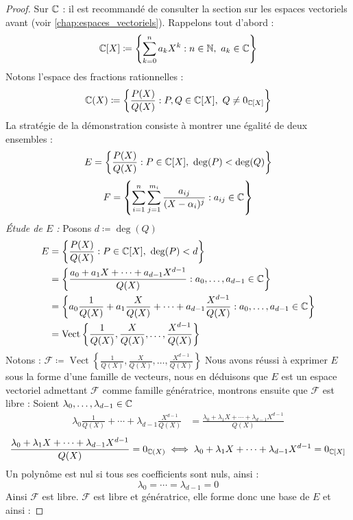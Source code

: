 \begin{proof}\cite{math-sup.fr_decomp}
    Sur $\mathbb{C}$ : il est recommandé de consulter la section sur les espaces vectoriels avant (voir \autoref{chap:espaces_vectoriels}).
    Rappelons tout d'abord :
    \[ \mathbb{C}[X] \coloneqq \left\{ \sum_{k = 0}^{n} a_k X^k : n \in \mathbb{N},\ a_k \in \mathbb{C} \right\} \]
    Notons l'espace des fractions rationnelles :
    \[ \mathbb{C}(X) \coloneqq \left\{ \frac{P(X)}{Q(X)} : P, Q \in \mathbb{C}[X],\ Q \neq 0_{\mathbb{C}[X]} \right\} \]
    La stratégie de la démonstration consiste à montrer une égalité de deux ensembles :
    \[ E = \left\{ \frac{P(X)}{Q(X)} : P \in \C[X],\ \deg(P) < \deg(Q) \right\} \]
    \[ F = \left\{ \sum_{i = 1}^{n} \sum_{j = 1}^{m_i} \frac{a_{ij}}{(X - \alpha_i)^{j}} : a_{ij} \in \mathbb{C} \right\} \]
    \emph{\'Etude de $E$ :} Posons $d \coloneqq \deg(Q)$
    \begin{align*}
        E &= \left\{ \frac{P(X)}{Q(X)} : P \in \mathbb{C}[X],\ \deg(P) < d \right\} \\
          &= \left\{ \frac{a_0 + a_1X + \cdots + a_{d - 1} X^{d - 1}}{Q(X)} : a_0, \ldots, a_{d - 1} \in \mathbb{C} \right\} \\
          &= \left\{ a_0 \frac{1}{Q(X)} + a_1 \frac{X}{Q(X)} + \cdots + a_{d - 1} \frac{X^{d-1}}{Q(X)} : a_0, \ldots, a_{d - 1} \in \mathbb{C} \right\} \\
          &= \operatorname{Vect}\left\{ \frac{1}{Q(X)}, \frac{X}{Q(X)}, \ldots, \frac{X^{d-1}}{Q(X)} \right\}
    \end{align*}
    Notons : $\mathcal{F} \coloneqq \operatorname{Vect}\left\{ \frac{1}{Q(X)}, \frac{X}{Q(X)}, \ldots, \frac{X^{d-1}}{Q(X)} \right\}$
    Nous avons réussi à exprimer $E$ sous la forme d'une famille de vecteurs, nous en déduisons que $E$ est un espace vectoriel admettant $\mathcal{F}$ comme famille génératrice, montrons ensuite que $\mathcal{F}$ est libre :
    Soient $ \lambda_0,\ldots,\lambda_{d-1} \in \mathbb{C}$
    \begin{align*}
        \lambda_0 \frac{1}{Q(X)} + \cdots + \lambda_{d - 1} \frac{X^{d-1}}{Q(X)} &= \frac{\lambda_0 + \lambda_{1} X + \cdots + \lambda_{d - 1} X^{d - 1}}{Q(X)}
    \end{align*}
    \[ \frac{\lambda_0 + \lambda_{1} X + \cdots + \lambda_{d - 1} X^{d - 1}}{Q(X)} = 0_{\mathbb{C}(X)} \iff \lambda_0 + \lambda_{1} X + \cdots + \lambda_{d - 1} X^{d - 1} = 0_{\mathbb{C}[X]} \]
    Un polynôme est nul si tous ses coefficients sont nuls, ainsi :
    \[ \lambda_0 = \cdots = \lambda_{d-1} = 0 \]
    Ainsi $\mathcal{F}$ est libre. $\mathcal{F}$ est libre et génératrice, elle forme donc une base de $E$ et ainsi : 

\end{proof}
